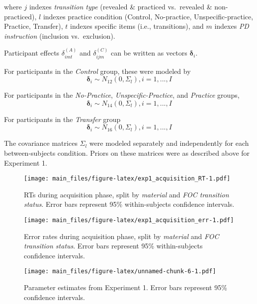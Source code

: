 \documentclass[floatsintext,man]{apa6}
\begin{document}
\begin{appendix}
  where \(j\) indexes \emph{transition type} (revealed \& practiced
  vs.~revealed \& non-practiced), \(l\) indexes practice condition
  (Control, No-practice, Unspecific-practice, Practice, Transfer), \(t\)
  indexes specific items (i.e., transitions), and \(m\) indexes \emph{PD
  instruction} (inclusion vs.~exclusion).
  
  Participant effects \(\delta_{imt}^{(A)}\) and \(\delta_{ijm}^{(C)}\)
  can be written as vectors \(\boldsymbol{\delta}_i\).
  
  For participants in the \emph{Control} group, these were modeled by \[
  \boldsymbol{\delta}_i \sim N_{12} (0, \Sigma_l), i = 1, ..., I
  \]
  
  For participants in the \emph{No-Practice}, \emph{Unspecific-Practice},
  and \emph{Practice} groups, \[
  \boldsymbol{\delta}_i \sim N_{14} (0, \Sigma_l), i = 1, ..., I
  \]
  
  For participants in the \emph{Transfer} group \[
  \boldsymbol{\delta}_i \sim N_{16} (0, \Sigma_l), i = 1, ..., I
  \]
  
  The covariance matrices \(\Sigma_l\) were modeled separately and
  independently for each between-subjects condition. Priors on these
  matrices were as described above for Experiment 1.
  
  \hypertarget{refs}{}
  \end{appendix}
  

\clearpage

\begin{figure}[htbp]
\centering
\texttt{[image: main\_files/figure-latex/exp1\_acquisition\_RT-1.pdf]}
\caption{RTs during acquisition phase, split by \emph{material} and
\emph{FOC transition status}. Error bars represent 95\% within-subjects
confidence intervals.}
\end{figure}

\begin{figure}[htbp]
\centering
\texttt{[image: main\_files/figure-latex/exp1\_acquisition\_err-1.pdf]}
\caption{Error rates during acquisition phase, split by \emph{material}
and \emph{FOC transition status}. Error bars represent 95\%
within-subjects confidence intervals.}
\end{figure}

\begin{figure}[htbp]
\centering
\texttt{[image: main\_files/figure-latex/unnamed-chunk-6-1.pdf]}
\caption{Parameter estimates from Experiment 1. Error bars represent
95\% confidence intervals.}
\end{figure}
\end{document}
